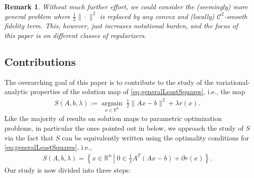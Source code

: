 \documentclass[reqno]{amsart}
\newtheorem{remark}[proposition]{Remark}
\numberwithin{equation}{section}
\newcommand{\R}{\mathbb{R}}
\newcommand{\argmin}{\operatorname{argmin}}
\newcommand{\set}[2]{\left\{#1\,\left\vert\; #2\right.\right\}}
\begin{document}
\begin{remark} Without  much further effort, we could consider the (seemingly) more general problem where $\frac{1}{2}\|\cdot\|^2$ is  replaced by any convex and (locally) $\mathcal{C}^2$-smooth fidelity term. This, however, just increases notational burden, and the focus of this paper is on different classes of regularizers. 
\end{remark}









\subsection{Contributions} 
The overarching goal of this paper is to contribute to the study of the variational-analytic properties of the solution map of \eqref{eq:generalLeastSquares}, i.e., the map 
\begin{align}\label{eq:S}
  S(A,b,\lambda):= \underset{x \in \R^n}{\argmin}\;   \frac{1}{2}\|Ax-b\|^2 + \lambda r(x).
\end{align}
Like the  majority of results on solution maps to parametric optimization problems, in particular the ones pointed out in  below, we approach the study of $S$ via the fact that $S$ can be equivalently written   using the optimality conditions for \eqref{eq:generalLeastSquares}, i.e., 
\begin{align}\label{eq:S2}
S(A,b,\lambda)= \set{x\in \R^n}{0\in \frac{1}{\lambda}A^T(Ax-b)+\partial r(x)}.
\end{align}
Our study is now divided into three steps: 
\medskip
\end{document}
